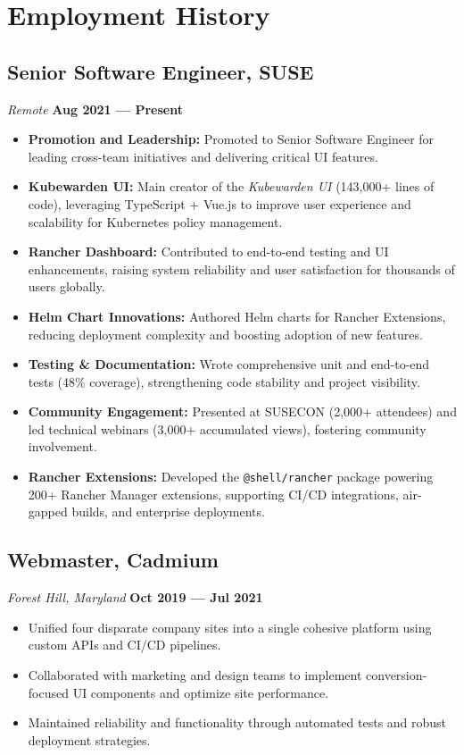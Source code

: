 \documentclass[a4paper,10pt]{article}
\begin{document}
\section*{Employment History}

\subsection*{Senior Software Engineer, SUSE}
\textit{Remote} \hfill \textbf{Aug 2021 — Present}
\begin{itemize}[leftmargin=1.5em]
    \item \textbf{Promotion and Leadership:} Promoted to Senior Software Engineer for leading cross-team initiatives and delivering critical UI features.
    \item \textbf{Kubewarden UI:} Main creator of the \textit{Kubewarden UI} (143,000+ lines of code), leveraging TypeScript + Vue.js to improve user experience and scalability for Kubernetes policy management.
    \item \textbf{Rancher Dashboard:} Contributed to end-to-end testing and UI enhancements, raising system reliability and user satisfaction for thousands of users globally.
    \item \textbf{Helm Chart Innovations:} Authored Helm charts for Rancher Extensions, reducing deployment complexity and boosting adoption of new features.
    \item \textbf{Testing \& Documentation:} Wrote comprehensive unit and end-to-end tests (48\% coverage), strengthening code stability and project visibility.
    \item \textbf{Community Engagement:} Presented at SUSECON (2,000+ attendees) and led technical webinars (3,000+ accumulated views), fostering community involvement.
    \item \textbf{Rancher Extensions:} Developed the \texttt{@shell/rancher} package powering 200+ Rancher Manager extensions, supporting CI/CD integrations, air-gapped builds, and enterprise deployments.
\end{itemize}

\subsection*{Webmaster, Cadmium}
\textit{Forest Hill, Maryland} \hfill \textbf{Oct 2019 — Jul 2021}
\begin{itemize}[leftmargin=1.5em]
    \item Unified four disparate company sites into a single cohesive platform using custom APIs and CI/CD pipelines.
    \item Collaborated with marketing and design teams to implement conversion-focused UI components and optimize site performance.
    \item Maintained reliability and functionality through automated tests and robust deployment strategies.
\end{itemize}
\end{document}
